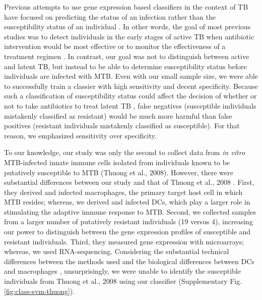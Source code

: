 \documentclass[fleqn,10pt]{wlscirep}
\begin{document}
Previous attempts to use gene expression based classifiers in the
context of TB have focused on predicting the status of an infection
rather than the susceptibility status of an individual
\cite{Berry2010, OGarra2013, Blankley2014}. In other words, the goal
of most previous studies was to detect individuals in the early stages
of active TB when antibiotic intervention would be most effective or
to monitor the effectiveness of a treatment regimen
\cite{Maertzdorf2015}. In contrast, our goal was not to distinguish
between active and latent TB, but instead to be able to determine
susceptibility status before individuals are infected with MTB. Even
with our small sample size, we were able to successfully train a
classier with high sensitivity and decent specificity. Because such a
classification of susceptibility status could affect the decision of
whether or not to take antibiotics to treat latent TB
\cite{Munoz2015}, false negatives (susceptible individuals mistakenly
classified as resistant) would be much more harmful than false
positives (resistant individuals mistakenly classified as
susceptible). For that reason, we emphasized sensitivity over
specificity.

To our knowledge, our study was only the second to collect data from
\emph{in vitro} MTB-infected innate immune cells isolated from
individuals known to be putatively susceptible to MTB (Thuong et al.,
2008). However, there were substantial differences between our study
and that of Thuong et al., 2008 \cite{Thuong2008}. First, they derived
and infected macrophages, the primary target host cell in which MTB
resides; whereas, we derived and infected DCs, which play a larger
role in stimulating the adaptive immune response to MTB. Second, we
collected samples from a larger number of putatively resistant
individuals (19 versus 4), increasing our power to distinguish between
the gene expression profiles of susceptible and resistant individuals.
Third, they measured gene expression with microarrays; whereas, we
used RNA-sequencing. Considering the substantial technical differences
between the methods used and the biological differences between DCs
and macrophages \cite{Chaussabel2003,Tailleux2008}, unsurprisingly, we
were unable to identify the susceptible individuals from Thuong et
al., 2008 \cite{Thuong2008} using our classifier (Supplementary Fig.
\ref{fig:class-svm-thuong}).
\end{document}
